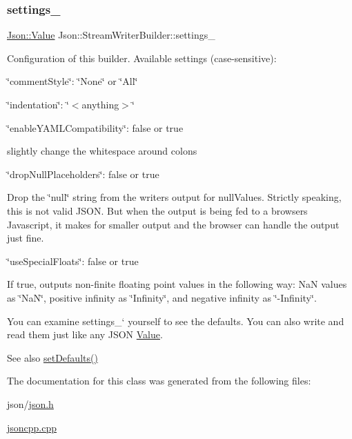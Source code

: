 \subsubsection{\texorpdfstring{settings\+\_\+}{settings\_}}
{\footnotesize\ttfamily \hyperlink{classJson_1_1Value}{Json\+::\+Value} Json\+::\+Stream\+Writer\+Builder\+::settings\+\_\+}

Configuration of this builder. Available settings (case-\/sensitive)\+:
\begin{DoxyItemize}
\item \char`\"{}comment\+Style\char`\"{}\+: \char`\"{}\+None\char`\"{} or \char`\"{}\+All\char`\"{}
\item \char`\"{}indentation\char`\"{}\+: \char`\"{}$<$anything$>$\char`\"{}
\item \char`\"{}enable\+Y\+A\+M\+L\+Compatibility\char`\"{}\+: false or true
\begin{DoxyItemize}
\item slightly change the whitespace around colons
\end{DoxyItemize}
\item \char`\"{}drop\+Null\+Placeholders\char`\"{}\+: false or true
\begin{DoxyItemize}
\item Drop the \char`\"{}null\char`\"{} string from the writer\textquotesingle{}s output for null\+Values. Strictly speaking, this is not valid J\+S\+ON. But when the output is being fed to a browser\textquotesingle{}s Javascript, it makes for smaller output and the browser can handle the output just fine.
\end{DoxyItemize}
\item \char`\"{}use\+Special\+Floats\char`\"{}\+: false or true
\begin{DoxyItemize}
\item If true, outputs non-\/finite floating point values in the following way\+: NaN values as \char`\"{}\+Na\+N\char`\"{}, positive infinity as \char`\"{}\+Infinity\char`\"{}, and negative infinity as \char`\"{}-\/\+Infinity\char`\"{}.
\end{DoxyItemize}
\end{DoxyItemize}

You can examine \textquotesingle{}settings\+\_\+` yourself to see the defaults. You can also write and read them just like any J\+S\+ON \hyperlink{classJson_1_1Value}{Value}. \begin{DoxySeeAlso}{See also}
\hyperlink{classJson_1_1StreamWriterBuilder_a53bf106b141e28637b01ad0ecd2acbf6_a53bf106b141e28637b01ad0ecd2acbf6}{set\+Defaults()} 
\end{DoxySeeAlso}


The documentation for this class was generated from the following files\+:\begin{DoxyCompactItemize}
\item 
json/\hyperlink{json_8h}{json.\+h}\item 
\hyperlink{jsoncpp_8cpp}{jsoncpp.\+cpp}\end{DoxyCompactItemize}
